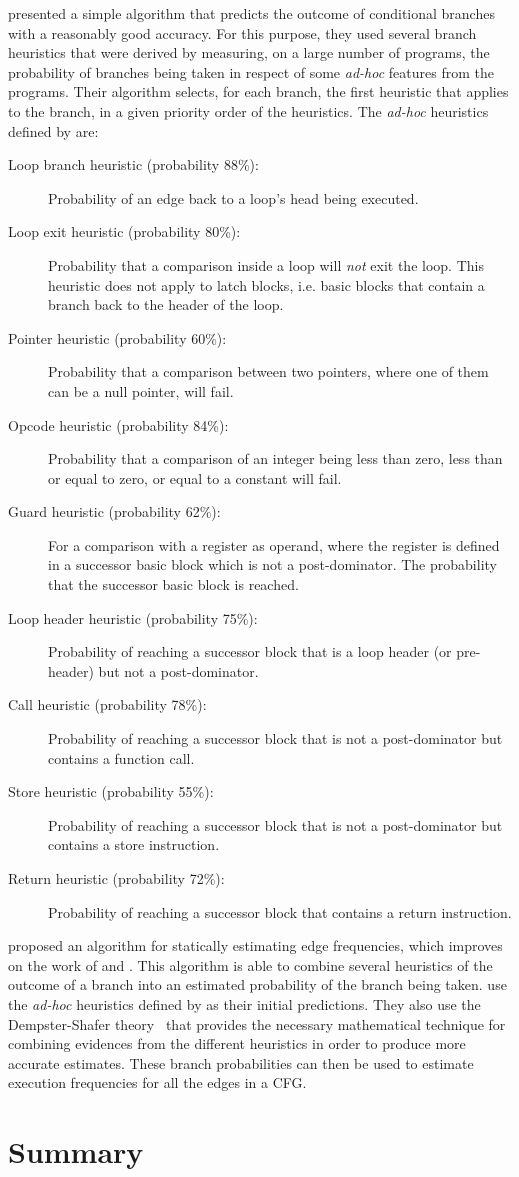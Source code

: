 \cite{ball93} presented a simple algorithm that predicts the outcome of conditional branches with a reasonably good accuracy.
For this purpose, they used several branch heuristics that were derived by measuring, on a large number of programs, the probability of branches being taken in respect of some \textit{ad-hoc} features from the programs.
Their algorithm selects, for each branch, the first heuristic that applies to the branch, in a given priority order of the heuristics.
The \textit{ad-hoc} heuristics defined by \cite{ball93} are:
\begin{description}
\item[Loop branch heuristic (probability 88\%):] Probability of an edge back to a loop's head being executed.
\item[Loop exit heuristic (probability 80\%):] Probability that a comparison inside a loop will \textit{not} exit the loop. This heuristic does not apply to latch blocks, i.e. basic blocks that contain a branch back to the header of the loop.
\item[Pointer heuristic (probability 60\%):] Probability that a comparison between two pointers, where one of them can be a null pointer, will fail.
\item[Opcode heuristic (probability 84\%):] Probability that a comparison of an integer being less than zero, less than or equal to zero, or equal to a constant will fail.
\item[Guard heuristic (probability 62\%):] For a comparison with a register as operand, where the register is defined in a successor basic block which is not a post-dominator. The probability that the successor basic block is reached.
\item[Loop header heuristic (probability 75\%):] Probability of reaching a successor block that is a loop header (or pre-header) but not a post-dominator.
\item[Call heuristic (probability 78\%):] Probability of reaching a successor block that is not a post-dominator but contains a function call.
\item[Store heuristic (probability 55\%):] Probability of reaching a successor block that is not a post-dominator but contains a store instruction.
\item[Return heuristic (probability 72\%):] Probability of reaching a successor block that contains a return instruction.
\end{description}

\cite{wu94} proposed an algorithm for statically estimating edge frequencies, which improves on the work of \cite{wagner94} and \cite{ball93}.
This algorithm is able to combine several heuristics of the outcome of a branch into an estimated probability of the branch being taken.
\cite{wu94} use the \textit{ad-hoc} heuristics defined by \cite{ball93} as their initial predictions.
They also use the Dempster-Shafer theory~\citep{shafer76} that provides the necessary mathematical technique for combining evidences from the different heuristics in order to produce more accurate estimates.
These branch probabilities can then be used to estimate execution frequencies
for all the edges in a CFG.

\section{Summary}
